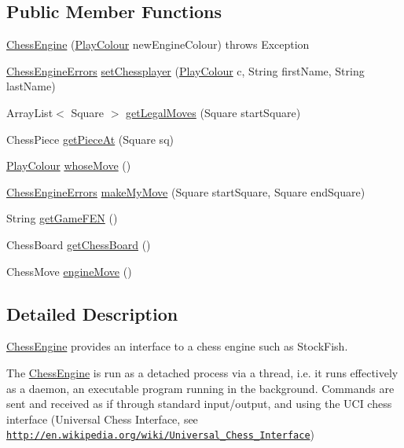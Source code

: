 \subsection*{Public Member Functions}
\begin{DoxyCompactItemize}
\item 
\hyperlink{classswantech_1_1_chess_engine_a206b7f60195b050af7bf73124a359bd5}{Chess\+Engine} (\hyperlink{enumswantech_1_1_play_colour}{Play\+Colour} new\+Engine\+Colour)  throws Exception     
\item 
\hyperlink{enumswantech_1_1_chess_engine_errors}{Chess\+Engine\+Errors} \hyperlink{classswantech_1_1_chess_engine_aa5030a1e441c0868999509e35652636c}{set\+Chessplayer} (\hyperlink{enumswantech_1_1_play_colour}{Play\+Colour} c, String first\+Name, String last\+Name)
\item 
Array\+List$<$ Square $>$ \hyperlink{classswantech_1_1_chess_engine_a529858ea407075c6a4daf04d5b3dd51e}{get\+Legal\+Moves} (Square start\+Square)
\item 
Chess\+Piece \hyperlink{classswantech_1_1_chess_engine_ad09f3dd52a728a42cdb1515e7104f03e}{get\+Piece\+At} (Square sq)
\item 
\hyperlink{enumswantech_1_1_play_colour}{Play\+Colour} \hyperlink{classswantech_1_1_chess_engine_ae6976be646e833558d31d2e3bf242773}{whose\+Move} ()
\item 
\hyperlink{enumswantech_1_1_chess_engine_errors}{Chess\+Engine\+Errors} \hyperlink{classswantech_1_1_chess_engine_a0e8106f504de2a1cec26d523865c3d02}{make\+My\+Move} (Square start\+Square, Square end\+Square)
\item 
String \hyperlink{classswantech_1_1_chess_engine_a06277d63732bbc472ad1a61e0f5e5ae8}{get\+Game\+F\+E\+N} ()
\item 
Chess\+Board \hyperlink{classswantech_1_1_chess_engine_aff2e5a7749c5e48afdbe544b879454fa}{get\+Chess\+Board} ()
\item 
Chess\+Move \hyperlink{classswantech_1_1_chess_engine_a4e2edbbc872baf9bd0f180a132090584}{engine\+Move} ()
\end{DoxyCompactItemize}


\subsection{Detailed Description}
\hyperlink{classswantech_1_1_chess_engine}{Chess\+Engine} provides an interface to a chess engine such as Stock\+Fish. 

The \hyperlink{classswantech_1_1_chess_engine}{Chess\+Engine} is run as a detached process via a thread, i.\+e. it runs effectively as a daemon, an executable program running in the background. Commands are sent and received as if through standard input/output, and using the U\+C\+I chess interface (Universal Chess Interface, see \href{http://en.wikipedia.org/wiki/Universal_Chess_Interface}{\tt http\+://en.\+wikipedia.\+org/wiki/\+Universal\+\_\+\+Chess\+\_\+\+Interface}) 


